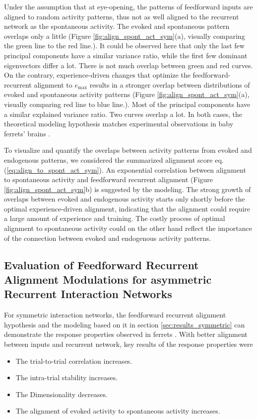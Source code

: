 \documentclass[11pt]{article}
\begin{document}
	Under the assumption that at eye-opening, the patterns of feedforward inputs are aligned to random activity patterns, thus not as well aligned to the recurrent network as the spontaneous activity. The evoked and spontaneous pattern overlaps only a little (Figure \ref{fig:align_spont_act_sym}(a), visually comparing the green line to the red line.). It could be observed here that only the last few principal components have a similar variance ratio, while the first few dominant eigenvectors differ a lot. There is not much overlap between green and red curves. On the contrary, experience-driven changes that optimize the feedforward-recurrent alignment to $e_{\text{max}}$ results in a stronger overlap between distributions of evoked and spontaneous activity patterns (Figure \ref{fig:align_spont_act_sym}(a), visually comparing red line to blue line.). Most of the principal components have a similar explained variance ratio. Two curves overlap a lot. In both cases, the theoretical modeling hypothesis matches experimental observations in baby ferrets' brains \cite{tragenap2023nature}.
	
	To visualize and quantify the overlaps between activity patterns from evoked and endogenous patterns, we considered the summarized alignment score eq.(\ref{eq:align_to_spont_act_sym}). An exponential correlation between alignment to spontaneous activity and feedforward recurrent alignment (Figure \ref{fig:align_spont_act_sym}b) is suggested by the modeling. The strong growth of overlaps between evoked and endogenous activity starts only shortly before the optimal experience-driven alignment, indicating that the alignment could require a large amount of experience and training. The costly process of optimal alignment to spontaneous activity could on the other hand reflect the importance of the connection between evoked and endogenous activity patterns. 
	
	\clearpage
	\subsection{Evaluation of Feedforward Recurrent Alignment Modulations for asymmetric Recurrent Interaction Networks} \label{sec:asymmetric_results}
	For symmetric interaction networks, the feedforward recurrent alignment hypothesis and the modeling based on it in section \ref{sec:results_symmetric} can demonstrate the response properties observed in ferrets \cite{tragenap2023nature}. With better alignment between inputs and recurrent network, key results of the response properties were
		\begin{itemize}
			\item The trial-to-trial correlation increases.
			\item The intra-trial stability increases.
			\item The Dimensionality decreases.
			\item The alignment of evoked activity to spontaneous activity increases.
		\end{itemize}
	
\end{document}
